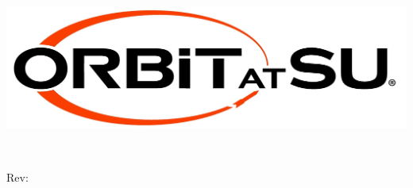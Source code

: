 \thispagestyle{empty}

\makeatletter
\includegraphics[width=\textwidth]{../Templates/logo.jpg}\\[4ex]
\begin{center}
	\bfseries \fontsize{36}{36}\selectfont  \@title \\[2ex]
	\LARGE  \@itemcode
\end{center}
\vfill
\begin{flushright}
	\LARGE Rev: \@revnumber\\
	\large \@author\\
	\large \@date\\[18ex]
\end{flushright}
\makeatother
\clearpage


